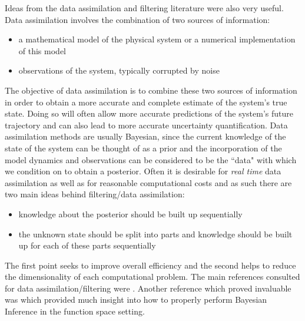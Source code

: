 Ideas from the data assimilation and filtering literature were also very useful. Data assimilation involves the combination of two sources of information:
\begin{itemize}
    \item a mathematical model of the physical system or a numerical implementation of this model
    \item observations of the system, typically corrupted by noise
\end{itemize}
The objective of data assimilation \textcolor{blue}{\citep{law2015data}} is to combine these two sources of information in order to obtain a more accurate and complete estimate of the system's true state. Doing so will often allow more accurate predictions of the system's future trajectory and can also lead to more accurate uncertainty quantification. Data assimilation methods are usually Bayesian, since the current knowledge of the state of the system can be thought of as a prior and the incorporation of the model dynamics and observations can be considered to be the ``data" with which we condition on to obtain a posterior. Often it is desirable for \textit{real time} data assimilation as well as for reasonable computational costs and as such there are two main ideas behind filtering/data assimilation:
\begin{itemize}
    \item knowledge about the posterior should be built up sequentially
    \item the unknown state should be split into parts and knowledge should be built up for each of these parts sequentially
\end{itemize}
The first point seeks to improve overall efficiency and the second helps to reduce the dimensionality of each computational problem. The main references consulted for data assimilation/filtering were \textcolor{blue}{\citep{law2015data,sullivan2015introduction,sarkka2013bayesian}}. Another reference which proved invaluable was \textcolor{blue}{\citep{stuart2010inverse}} which provided much insight into how to properly perform Bayesian Inference in the function space setting.

